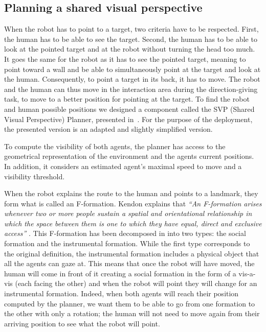 \subsection{Planning a shared visual perspective}

When the robot has to point to a target, two criteria have to be respected. First, the human has to be able to see the target. Second, the human has to be able to look at the pointed target and at the robot without turning the head too much. It goes the same for the robot as it has to see the pointed target, meaning to point toward a wall and be able to simultaneously point at the target and look at the human. Consequently, to point a target in its back, it has to move. The robot and the human can thus move in the interaction area during the direction-giving task, to move to a better position for pointing at the target. To find the robot and human possible positions we designed a component called the SVP (Shared Visual Perspective) Planner, presented in~\cite{waldhart_2019_reasoning}. For the purpose of the deployment, the presented version is an adapted and slightly simplified version.

To compute the visibility of both agents, the planner has access to the geometrical representation of the environment and the agents current positions. In addition, it considers an estimated agent's maximal speed to move and a visibility threshold.

When the robot explains the route to the human and points to a landmark, they form what is called an F-formation. Kendon explains that \textit{``An F-formation arises whenever two or more people sustain a spatial and orientational relationship in which the space between them is one to which they have equal, direct and exclusive access''} \cite{kendon_1990_conducting}.
This F-formation has been decomposed in \cite{mcneill_2005_gesture} into two types: the social formation and the instrumental formation. While the first type corresponds to the original definition, the instrumental formation includes a physical object that all the agents can gaze at. This means that once the robot will have moved, the human will come in front of it creating a social formation in the form of a vis-a-vis (each facing the other) and when the robot will point they will change for an instrumental formation. Indeed, when both agents will reach their position computed by the planner, we want them to be able to go from one formation to the other with only a rotation; the human will not need to move again from their arriving position to see what the robot will point. 

